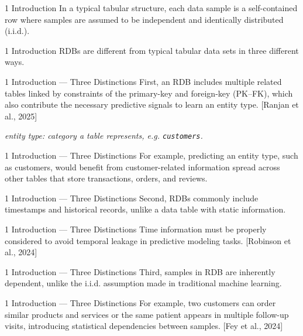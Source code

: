 \documentclass[aspectratio=169,10pt]{beamer}
\newcommand{\cit}[1]{{\scriptsize\color{gray}[#1]}}
\newcommand{\explainer}[1]{{\footnotesize\color{gray}\textit{#1}}}
\begin{document}
\begin{frame}{1 Introduction}
In a typical tabular structure, each data sample is a self-contained row where samples are assumed to be independent and identically distributed (i.i.d.).
\end{frame}

\begin{frame}{1 Introduction}
RDBs are different from typical tabular data sets in three different ways.
\end{frame}

\begin{frame}{1 Introduction --- Three Distinctions}
First, an RDB includes multiple related tables linked by constraints of the primary-key and foreign-key (PK--FK), which also contribute the necessary predictive signals to learn an entity type.
\cit{Ranjan et al., 2025}

\vspace{1em}
\explainer{entity type: category a table represents, e.g. \texttt{customers}.}
\end{frame}

\begin{frame}{1 Introduction --- Three Distinctions}
For example, predicting an entity type, such as customers, would benefit from customer-related information spread across other tables that store transactions, orders, and reviews.
\end{frame}

\begin{frame}{1 Introduction --- Three Distinctions}
Second, RDBs commonly include timestamps and historical records, unlike a data table with static information.
\end{frame}

\begin{frame}{1 Introduction --- Three Distinctions}
Time information must be properly considered to avoid temporal leakage in predictive modeling tasks.
\cit{Robinson et al., 2024}
\end{frame}

\begin{frame}{1 Introduction --- Three Distinctions}
Third, samples in RDB are inherently dependent, unlike the i.i.d. assumption made in traditional machine learning.
\end{frame}

\begin{frame}{1 Introduction --- Three Distinctions}
For example, two customers can order similar products and services or the same patient appears in multiple follow-up visits, introducing statistical dependencies between samples.
\cit{Fey et al., 2024}
\end{frame}
\end{document}
